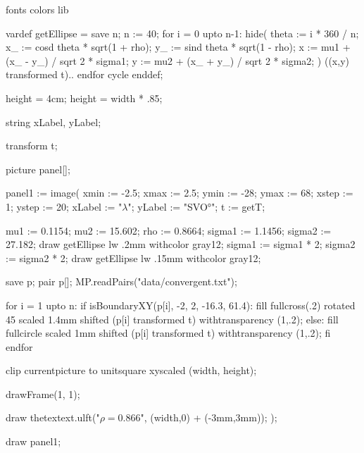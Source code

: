 \environment fonts
\environment colors
\environment lib

\startMPdefinitions
vardef getEllipse =
  save n; n := 40;
  for i = 0 upto n-1:
    hide(
      theta := i * 360 / n;
      x_ := cosd theta * sqrt(1 + rho);
      y_ := sind theta * sqrt(1 - rho);
      x := mu1 + (x_ - y_) / sqrt 2 * sigma1;
      y := mu2 + (x_ + y_) / sqrt 2 * sigma2;
    )
    ((x,y) transformed t)..
  endfor cycle
enddef;
\stopMPdefinitions

\startMPpage

height = 4cm;
height = width * .85;

string xLabel, yLabel;

transform t;

picture panel[];

panel1 := image(
  xmin := -2.5;
  xmax := 2.5;
  ymin := -28;
  ymax := 68;
  xstep := 1;
  ystep := 20;
  xLabel := "$\lambda$";
  yLabel := "SVO°";
  t := getT;



  mu1 := 0.1154;
  mu2 := 15.602;
  rho := 0.8664;
  sigma1 := 1.1456;
  sigma2 := 27.182;
  draw getEllipse lw .2mm withcolor gray12;
  sigma1 := sigma1 * 2;
  sigma2 := sigma2 * 2;
  draw getEllipse lw .15mm withcolor gray12;

  save p; pair p[];
  MP.readPairs("data/convergent.txt");

  for i = 1 upto n:
    if isBoundaryXY(p[i], -2, 2, -16.3, 61.4):
      fill fullcross(.2) rotated 45 scaled 1.4mm shifted (p[i] transformed t) withtransparency (1,.2);
    else:
      fill fullcircle scaled 1mm shifted (p[i] transformed t) withtransparency (1,.2);
    fi
  endfor

  clip currentpicture to unitsquare xyscaled (width, height);

  drawFrame(1, 1);

  draw thetextext.ulft("$\rho=0.866$", (width,0) + (-3mm,3mm));
);

draw panel1;
\stopMPpage